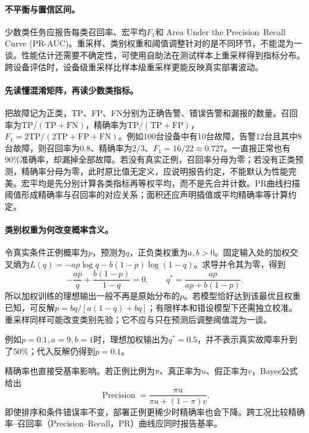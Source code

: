 \paragraph{不平衡与置信区间。}
少数类任务应报告每类召回率、宏平均$F_1$和 Area Under the Precision--Recall Curve (PR-AUC)。重采样、类别权重和阈值调整针对的是不同环节，不能混为一谈。性能估计还需要不确定性，可使用自助法在测试样本上重采样得到指标分布。跨设备评估时，设备级重采样比样本级重采样更能反映真实部署波动。

\paragraph{先读懂混淆矩阵，再读少数类指标。}
把故障记为正类，TP、FP、FN分别为正确告警、错误告警和漏报的数量。召回率为$\mathrm{TP}/(\mathrm{TP}+\mathrm{FN})$，精确率为$\mathrm{TP}/(\mathrm{TP}+\mathrm{FP})$，$F_1=2\mathrm{TP}/(2\mathrm{TP}+\mathrm{FP}+\mathrm{FN})$。例如100台设备中有10台故障，告警12台且其中8台故障，则召回率为$0.8$、精确率为$2/3$、$F_1=16/22\approx0.727$。一直报正常也有$90\%$准确率，却漏掉全部故障。若没有真实正例，召回率分母为零；若没有正类预测，精确率分母为零，此时原比值无定义，应说明报告约定，不能默认为性能完美。宏平均是先分别计算各类指标再等权平均，而不是先合并计数。PR曲线扫描阈值形成精确率与召回率的对应关系；面积还应声明插值或平均精确率等计算约定。

\paragraph{类别权重为何改变概率含义。}
令真实条件正例概率为$p$，预测为$q$，正负类权重为$a,b>0$。固定输入处的加权交叉熵为$L(q)=-ap\log q-b(1-p)\log(1-q)$。求导并令其为零，得到
\begin{equation}
 -\frac{ap}{q}+\frac{b(1-p)}{1-q}=0,
 \qquad q^*=\frac{ap}{ap+b(1-p)}.
\end{equation}
所以加权训练的理想输出一般不再是原始分布的$p$。若模型恰好达到该最优且权重已知，可反解$p=bq/[a(1-q)+bq]$；有限样本和错设模型下还需独立校准。重采样同样可能改变类别先验；它不应与只在预测后调整阈值混为一谈。

例如$p=0.1,a=9,b=1$时，理想加权输出为$q^*=0.5$，并不表示真实故障率升到了50\%；代入反解仍得到$p=0.1$。

精确率也直接受基率影响。若正例比例为$\pi$、真正率为$u$、假正率为$v$，Bayes公式给出
\begin{equation}
 \operatorname{Precision}=\frac{\pi u}{\pi u+(1-\pi)v}.
\end{equation}
即使排序和条件错误率不变，部署正例更稀少时精确率也会下降。跨工况比较精确率--召回率（Precision--Recall，PR）曲线应同时报告基率。

